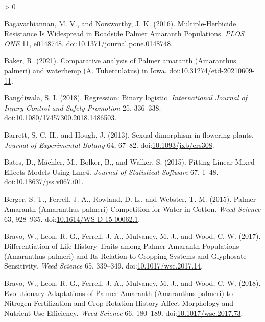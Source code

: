 \documentclass[utf8]{frontiersSCNS}
\newlength{\cslhangindent}
\newenvironment{CSLReferences}[2] %
 {%
  \setlength{\parindent}{0pt}
  \ifodd #1 \everypar{\setlength{\hangindent}{\cslhangindent}}\ignorespaces\fi
  \ifnum #2 > 0
  \setlength{\parskip}{#2\baselineskip}
  \fi
 }%
 {}
\begin{document}
\hypertarget{refs}{}
\begin{CSLReferences}{1}{0}
\leavevmode\hypertarget{ref-bagavathiannan2016}{}%
Bagavathiannan, M. V., and Norsworthy, J. K. (2016). Multiple-{Herbicide
Resistance Is Widespread} in {Roadside Palmer Amaranth Populations}.
\emph{PLOS ONE} 11, e0148748.
doi:\href{https://doi.org/10.1371/journal.pone.0148748}{10.1371/journal.pone.0148748}.

\leavevmode\hypertarget{ref-baker2021}{}%
Baker, R. (2021). Comparative analysis of {Palmer} amaranth
({Amaranthus} palmeri) and waterhemp ({A}. Tuberculatus) in {Iowa}.
doi:\href{https://doi.org/10.31274/etd-20210609-11}{10.31274/etd-20210609-11}.

\leavevmode\hypertarget{ref-bangdiwala2018}{}%
Bangdiwala, S. I. (2018). Regression: Binary logistic.
\emph{International Journal of Injury Control and Safety Promotion} 25,
336--338.
doi:\href{https://doi.org/10.1080/17457300.2018.1486503}{10.1080/17457300.2018.1486503}.

\leavevmode\hypertarget{ref-barrett2013}{}%
Barrett, S. C. H., and Hough, J. (2013). Sexual dimorphism in flowering
plants. \emph{Journal of Experimental Botany} 64, 67--82.
doi:\href{https://doi.org/10.1093/jxb/ers308}{10.1093/jxb/ers308}.

\leavevmode\hypertarget{ref-bates2015}{}%
Bates, D., Mächler, M., Bolker, B., and Walker, S. (2015). Fitting
{Linear Mixed}-{Effects Models Using} Lme4. \emph{Journal of Statistical
Software} 67, 1--48.
doi:\href{https://doi.org/10.18637/jss.v067.i01}{10.18637/jss.v067.i01}.

\leavevmode\hypertarget{ref-berger2015}{}%
Berger, S. T., Ferrell, J. A., Rowland, D. L., and Webster, T. M.
(2015). Palmer {Amaranth} ({Amaranthus} palmeri) {Competition} for
{Water} in {Cotton}. \emph{Weed Science} 63, 928--935.
doi:\href{https://doi.org/10.1614/WS-D-15-00062.1}{10.1614/WS-D-15-00062.1}.

\leavevmode\hypertarget{ref-bravo2017}{}%
Bravo, W., Leon, R. G., Ferrell, J. A., Mulvaney, M. J., and Wood, C. W.
(2017). Differentiation of {Life}-{History Traits} among {Palmer
Amaranth Populations} ({Amaranthus} palmeri) and {Its Relation} to
{Cropping Systems} and {Glyphosate Sensitivity}. \emph{Weed Science} 65,
339--349.
doi:\href{https://doi.org/10.1017/wsc.2017.14}{10.1017/wsc.2017.14}.

\leavevmode\hypertarget{ref-bravo2018}{}%
Bravo, W., Leon, R. G., Ferrell, J. A., Mulvaney, M. J., and Wood, C. W.
(2018). Evolutionary {Adaptations} of {Palmer Amaranth} ({Amaranthus}
palmeri) to {Nitrogen Fertilization} and {Crop Rotation History Affect
Morphology} and {Nutrient}-{Use Efficiency}. \emph{Weed Science} 66,
180--189.
doi:\href{https://doi.org/10.1017/wsc.2017.73}{10.1017/wsc.2017.73}.


\end{CSLReferences}
\end{document}
